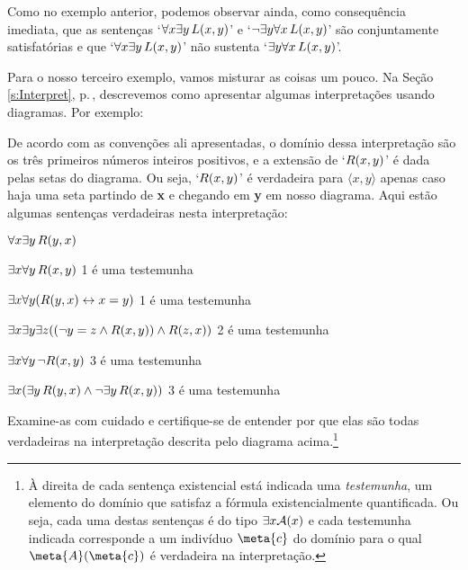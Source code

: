 Como no exemplo anterior, podemos observar ainda, como consequência imediata, que as sentenças `$\forall x \exists y\, \mathord{L}(x,y)$' e `$\neg\exists y \forall x\, \mathord{L}(x,y)$' são conjuntamente satisfatórias e que `$\forall x \exists y\, \mathord{L}(x,y)$' não sustenta `$\exists y \forall x\, \mathord{L}(x,y)$'.

Para o nosso terceiro exemplo, vamos misturar as coisas um pouco.
Na Seção \ref{s:Interpret}, p.\,\pageref{s:Interpret}, descrevemos como apresentar algumas interpretações usando diagramas. Por exemplo:
\begin{center}
\end{center}
De acordo com as convenções ali apresentadas, o domínio dessa interpretação são os três primeiros números inteiros positivos, e a extensão de  `$\mathord{R}(x,y)$' é dada pelas setas do diagrama.
Ou seja, `$\mathord{R}(x,y)$' é verdadeira para $\langle x, y \rangle$ apenas caso haja uma seta partindo  de \textbf{x} e chegando em \textbf{y} em nosso diagrama.
Aqui estão algumas sentenças verdadeiras nesta interpretação:
	\begin{ebullet}
		\item $\forall x \exists y\, \mathord{R}(y,x)$ 
		\item $\exists x \forall y\, \mathord{R}(x,y)$ \hfill  {\footnotesize 1 é uma testemunha}
		\item $\exists x \forall y (\mathord{R}(y,x) \leftrightarrow x = y)$ \hfill {\footnotesize 1 é uma testemunha}
		\item $\exists x \exists y \exists z ((\neg y = z \wedge \mathord{R}(x,y)) \wedge \mathord{R}(z,x))$ \hfill {\footnotesize 2 é uma testemunha}
		\item $\exists x \forall y\, \neg \mathord{R}(x,y)$ \hfill {\footnotesize 3 é uma testemunha}
		\item $\exists x (\exists y\, \mathord{R}(y,x) \wedge \neg \exists y\, \mathord{R}(x,y))$ \hfill {\footnotesize 3 é uma testemunha}
	\end{ebullet}
Examine-as com cuidado e certifique-se de entender por que elas são todas verdadeiras na interpretação descrita pelo diagrama acima.\footnote{
	À direita de cada sentença existencial está indicada uma \textit{testemunha}, um elemento do domínio que satisfaz a fórmula existencialmente quantificada.
	Ou seja, cada uma destas sentenças é do tipo $\exists x \mathord{\mathcal{A}}(x)$ e cada testemunha indicada corresponde a um indivíduo $\meta{c}$ do domínio para o qual $\atom{\meta{A}}{\meta{c}}$ é verdadeira na interpretação.}	
	
